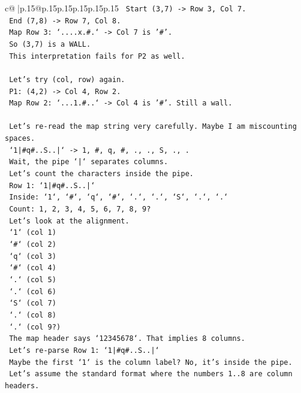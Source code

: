 \documentclass{article}
\begin{document}
{\begin{supertabular}{c@{$\;$}|p{.15\linewidth}@{}p{.15\linewidth}p{.15\linewidth}p{.15\linewidth}p{.15\linewidth}p{.15\linewidth}}
{{{\texttt{   Start (3,7) {-}> Row 3, Col 7.} \\
\texttt{   End (7,8) {-}> Row 7, Col 8.} \\
\texttt{   Map Row 3: `....x.\#.` {-}> Col 7 is '\#'.} \\
\texttt{   So (3,7) is a WALL.} \\
\texttt{   This interpretation fails for P2 as well.} \\
\\ 
\texttt{   Let's try (col, row) again.} \\
\texttt{   P1: (4,2) {-}> Col 4, Row 2.} \\
\texttt{   Map Row 2: `...1.\#..` {-}> Col 4 is '\#'. Still a wall.} \\
\\ 
\texttt{   Let's re{-}read the map string very carefully. Maybe I am miscounting spaces.} \\
\texttt{   `1|\#q\#..S..|` {-}> 1, \#, q, \#, ., ., S, ., .} \\
\texttt{   Wait, the pipe `|` separates columns.} \\
\texttt{   Let's count the characters inside the pipe.} \\
\texttt{   Row 1: `1|\#q\#..S..|`} \\
\texttt{   Inside: `1`, `\#`, `q`, `\#`, `.`, `.`, `S`, `.`, `.`} \\
\texttt{   Count: 1, 2, 3, 4, 5, 6, 7, 8, 9?} \\
\texttt{   Let's look at the alignment.} \\
\texttt{   `1` (col 1)} \\
\texttt{   `\#` (col 2)} \\
\texttt{   `q` (col 3)} \\
\texttt{   `\#` (col 4)} \\
\texttt{   `.` (col 5)} \\
\texttt{   `.` (col 6)} \\
\texttt{   `S` (col 7)} \\
\texttt{   `.` (col 8)} \\
\texttt{   `.` (col 9?)} \\
\texttt{   The map header says `12345678`. That implies 8 columns.} \\
\texttt{   Let's re{-}parse Row 1: `1|\#q\#..S..|`} \\
\texttt{   Maybe the first `1` is the column label? No, it's inside the pipe.} \\
\texttt{   Let's assume the standard format where the numbers 1..8 are column headers.} \\
}}}
\end{supertabular}}
\end{document}
